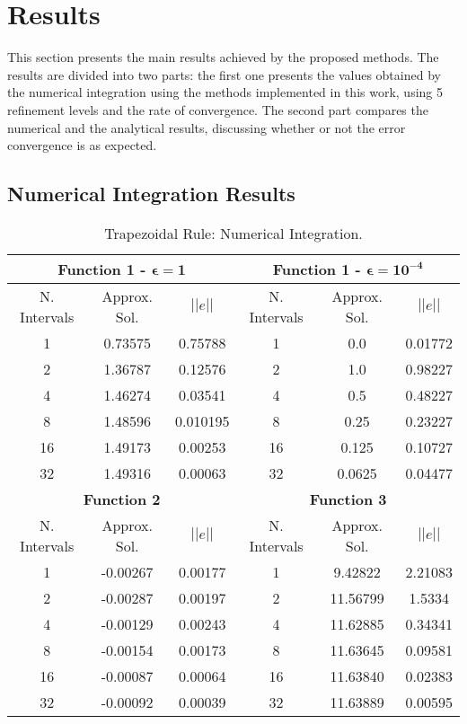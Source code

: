 \section{Results} \label{sec:results}
This section presents the main results achieved by the proposed methods. The results are divided into two parts: the first one presents the values obtained by the numerical integration using the methods implemented in this work, using 5 refinement levels and the rate of convergence. The second part compares the numerical and the analytical results, discussing whether or not the error convergence is as expected. 


\subsection{Numerical Integration Results}
\begin{table}[H]
    \centering
    \caption{Trapezoidal Rule: Numerical Integration.}
    \begin{tabular}{ccc|ccc}
    \hline
    \multicolumn{3}{c}{\textbf{Function 1  -} $\bm{\epsilon = 1}$} & \multicolumn{3}{c}{\textbf{Function 1 -} $\bm{\epsilon = 10^{-4}}$} \\ \hline
    N. Intervals & Approx. Sol. & $|| e ||$ & N. Intervals & Approx. Sol. & $|| e ||$ \\ \hline
    1 & 0.73575 & 0.75788 & 1 & 0.0 & 0.01772 \\
    2 & 1.36787 & 0.12576 & 2 & 1.0 & 0.98227 \\
    4 & 1.46274 & 0.03541 & 4 & 0.5 & 0.48227 \\
    8 & 1.48596 & 0.010195 & 8 & 0.25 & 0.23227 \\
    16 & 1.49173 & 0.00253 & 16 & 0.125 & 0.10727 \\
    32 & 1.49316 & 0.00063 & 32 & 0.0625 & 0.04477 \\ \hline
    \multicolumn{3}{c}{\textbf{Function 2}} & \multicolumn{3}{c}{\bf{Function 3}} \\ \hline
    N. Intervals & Approx. Sol. & $|| e ||$ & N. Intervals & Approx. Sol. & $|| e ||$ \\ \hline
    1 &  {-0.00267} &  {0.00177} & 1 &  {9.42822} &  {2.21083} \\
    2 &  {-0.00287} &  {0.00197} & 2 &  {11.56799} &  {1.5334} \\
    4 &  {-0.00129} &  {0.00243} & 4 &  {11.62885} &  {0.34341} \\
    8 &  {-0.00154} &  {0.00173} & 8 &  {11.63645} &  {0.09581} \\
    16 &  {-0.00087} &  {0.00064} & 16 &  {11.63840} &  {0.02383} \\
    32 &  {-0.00092} &  {0.00039} & 32 &  {11.63889} &  {0.00595} \\ \hline
    \end{tabular}
\end{table}
